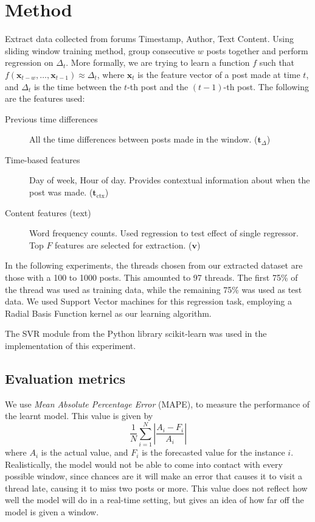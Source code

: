 \documentclass[12 pt]{article}
\begin{document}
\newcommand{\vocab}{\mathbf{v}}
\newcommand{\dtvec}{\mathbf{t}_\Delta}
\newcommand{\ctxvec}{\mathbf{t}_\text{ctx}}
\newcommand{\dt}{\Delta_t}
\newcommand{\prerror}{\Pr_{error}}

\section{Method}

Extract data collected from forums Timestamp, Author, Text Content. Using sliding window training method, group consecutive $w$ posts together and perform regression on $\dt$. More formally, we are trying to learn a function $f$ such that $f(\mathbf{x}_{t-w},\hdots, \mathbf{x}_{t-1}) \approx \Delta_{t}$, where $\mathbf{x}_t$ is the feature vector of a post made at time $t$, and $\dt$ is the time between the $t$-th post and the $(t-1)$-th post. The following are the features used:
\begin{description}
	\item[Previous time differences] All the time differences between posts made in the window. ($\dtvec$)
	\item[Time-based features] Day of week, Hour of day. Provides contextual information about when the post was made. ($\ctxvec$)
	
	\item[Content features (text)]
		Word frequency counts.
		Used regression to test effect of single regressor.
		Top $F$ features are selected for extraction. ($\vocab$)

\end{description}

In the following experiments, the threads chosen from our extracted dataset are those with a 100 to 1000 posts. This amounted to 97 threads. The first 75\% of the thread was used as training data, while the remaining 75\% was used as test data. We used Support Vector machines for this regression task, employing a Radial Basis Function kernel as our learning algorithm. 

The SVR module from the Python library scikit-learn was used in the implementation of this experiment.



\subsection{Evaluation metrics}
We use \emph{Mean Absolute Percentage Error} (MAPE), to measure the performance of the learnt model. This value is given by
\[
	\frac{1}{N}\sum^N_{i=1}\left|\frac{A_i-F_i}{A_i}\right|
\]
where $A_i$ is the actual value, and $F_i$ is the forecasted value for the instance $i$. Realistically, the model would not be able to come into contact with every possible window, since chances are it will make an error that causes %
it to visit a thread late, causing it to miss two posts or more. This value does not reflect how well the model will do in a real-time setting, but gives an idea of how far off the model is given a window. 
\end{document}
